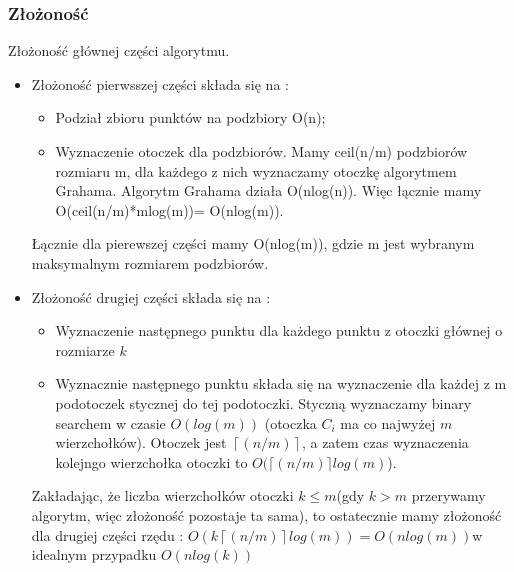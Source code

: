 \documentclass[11pt]{article}
\theoremstyle{remark} \newtheorem{definition}{def.}
\theoremstyle{definition} \newtheorem{twierdzenie}{tw.}
\begin{document}
    \subsubsection{Złożoność}
    Złożoność głównej części algorytmu.
    \begin{itemize}
        \item Złożoność pierwsszej części składa się na :
                \begin{itemize}
                    \item   Podział zbioru punktów na podzbiory O(n);
                    \item   Wyznaczenie otoczek dla podzbiorów. Mamy ceil(n/m) podzbiorów
                            rozmiaru m, dla każdego z nich wyznaczamy otoczkę algorytmem Grahama.
                            Algorytm Grahama działa O(nlog(n)). Więc łącznie mamy O(ceil(n/m)*mlog(m))=
                            O(nlog(m)).
                \end{itemize}
                Łącznie dla pierewszej części mamy O(nlog(m)), gdzie m jest wybranym maksymalnym
                 rozmiarem podzbiorów.

        \item Złożoność drugiej części składa się na :
                 \begin{itemize}
                     \item   Wyznaczenie następnego punktu dla każdego punktu z otoczki głównej o rozmiarze $k$
                     \item   Wyznacznie następnego punktu składa się na wyznaczenie dla każdej z m podotoczek
                            stycznej do tej podotoczki. Styczną wyznaczamy binary searchem w czasie $O(log(m))$
                            (otoczka $C_i$ ma co najwyżej $m$ wierzchołków). Otoczek jest $\left\lceil(n/m) \right\rceil$, a zatem czas
                            wyznaczenia kolejngo wierzchołka otoczki to $O(\lceil(n/m)\rceil log(m)$).    
                 \end{itemize}
                 Zakładając, że liczba wierzchołków otoczki $k \le m$(gdy $k > m$ przerywamy algorytm, więc złożoność pozostaje ta sama),
                  to ostatecznie mamy złożoność dla drugiej części rzędu : $O(k \left\lceil(n/m)\right\rceil log(m)) = O(nlog(m)) $w idealnym przypadku $O(nlog(k))$
    \end{itemize}
\end{document}
